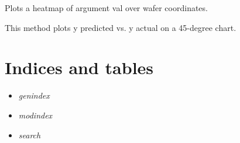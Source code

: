 \documentclass[letterpaper,10pt,english]{sphinxmanual}
\begin{document}

\begin{fulllineitems}
\label{qikify.views:qikify.views.charts.te_and_yl}
\end{fulllineitems}


\begin{fulllineitems}
\label{qikify.views:qikify.views.charts.wafermap}
Plots a heatmap of argument val over wafer coordinates.

\end{fulllineitems}


\begin{fulllineitems}
\label{qikify.views:qikify.views.charts.yp_vs_y}
This method plots y predicted vs. y actual on a 45-degree chart.

\end{fulllineitems}



\chapter{Indices and tables}
\label{index:indices-and-tables}\begin{itemize}
\item {} 
\emph{genindex}

\item {} 
\emph{modindex}

\item {} 
\emph{search}

\end{itemize}

\begin{thebibliography}{R1}
\end{thebibliography}
\end{document}
